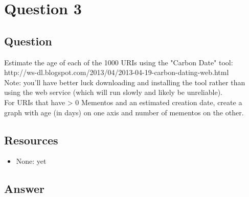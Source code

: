 \section{Question 3}

\subsection{Question}
Estimate the age of each of the 1000 URIs using the "Carbon Date" tool:\\

http://ws-dl.blogspot.com/2013/04/2013-04-19-carbon-dating-web.html\\

Note: you'll have better luck downloading and installing the tool 
rather than using the web service (which will run slowly and likely
be unreliable).\\

For URIs that have > 0 Mementos and an estimated creation date,
create a graph with age (in days) on one axis and number of mementos
on the other.\\

\subsection{Resources}
\begin{itemize}
\item None: yet
\end{itemize}

\subsection{Answer}
